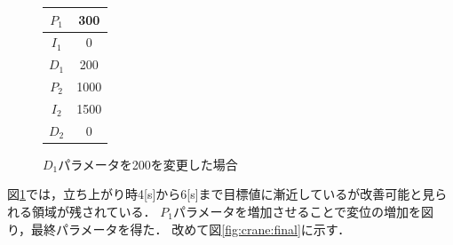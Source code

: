 \documentclass[dvipdfmx,titlepage,a4j]{jsarticle}  %
\begin{document}
\begin{figure}[H]
\begin{minipage}{3cm}
\begin{center}
      \begin{tabular}{c|c}
        \hline
        $P_1$ & 300  \\ \hline
        $I_1$ & 0    \\ \hline
        $D_1$ & 200  \\ \hline
        $P_2$ & 1000 \\ \hline
        $I_2$ & 1500 \\ \hline
        $D_2$ & 0    \\
        \hline
      \end{tabular}
    \end{center}
  \end{minipage}
  \hfill
  \caption{$D_1$パラメータを200を変更した場合}
  \label{fig:crane:12}
\end{figure}

図\ref{fig:crane:12}では，立ち上がり時4[s]から6[s]まで目標値に漸近しているが改善可能と見られる領域が残されている．
$P_1$パラメータを増加させることで変位の増加を図り，最終パラメータを得た．
改めて図\ref{fig:crane:final}に示す．
\end{document}
